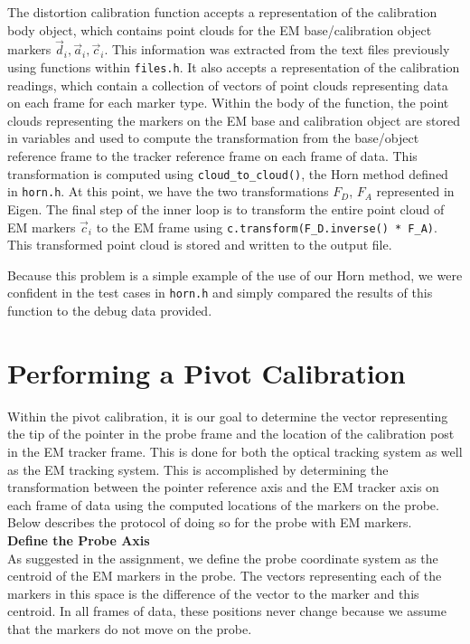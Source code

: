 \documentclass[letterpaper, 11pt]{report}
\begin{document}
The distortion calibration function accepts a representation of the calibration body object, which contains point clouds for the EM base/calibration object markers $\vec d_i, \vec a_i, \vec c_i$. This information was extracted from the text files previously using functions within \texttt{files.h}. It also accepts a representation of the calibration readings, which contain a collection of vectors of point clouds representing data on each frame for each marker type. Within the body of the function, the point clouds representing the markers on the EM base and calibration object are stored in variables and used to compute the transformation from the base/object reference frame to the tracker reference frame on each frame of data. This transformation is computed using \texttt{cloud\_to\_cloud()}, the Horn method defined in \texttt{horn.h}. At this point, we have the two transformations $F_D$, $F_A$ represented in Eigen. The final step of the inner loop is to transform the entire point cloud of EM markers $\vec c_i$ to the EM frame using \texttt{c.transform(F\_D.inverse() * F\_A)}. This transformed point cloud is stored and written to the output file.

Because this problem is a simple example of the use of our Horn method, we were confident in the test cases in \texttt{horn.h} and simply compared the results of this function to the debug data provided.

\section{Performing a Pivot Calibration}
Within the pivot calibration, it is our goal to determine the vector representing the tip of the pointer in the probe frame and the location of the calibration post in the EM tracker frame. This is done for both the optical tracking system as well as the EM tracking system. This is accomplished by determining the transformation between the pointer reference axis and the EM tracker axis on each frame of data using the computed locations of the markers on the probe. Below describes the protocol of doing so for the probe with EM markers.
\\

\textbf{Define the Probe Axis}\\
As suggested in the assignment, we define the probe coordinate system as the centroid of the EM markers in the probe. The vectors representing each of the markers in this space is the difference of the vector to the marker and this centroid. In all frames of data, these positions never change because we assume that the markers do not move on the probe.
\end{document}
